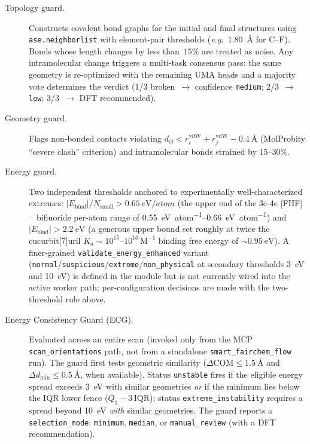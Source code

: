 \begin{description}
\item[Topology guard.] Constructs covalent bond graphs for the initial
  and final structures using \texttt{ase.neighborlist} with element-pair
  thresholds (\textit{e.g.}\ \SI{1.80}{\angstrom} for C--F). Bonds whose
  length changes by less than~$15\%$ are treated as noise. Any
  intramolecular change triggers a multi-task consensus pass: the same
  geometry is re-optimized with the remaining UMA heads and a majority
  vote determines the verdict (1/3 broken~$\to$ confidence
  \texttt{medium}; 2/3~$\to$ \texttt{low}; 3/3~$\to$ DFT recommended).
\item[Geometry guard.] Flags non-bonded contacts violating
  $d_{ij} < r_{i}^{\text{vdW}} + r_{j}^{\text{vdW}} -
  \SI{0.4}{\angstrom}$ (MolProbity ``severe clash'' criterion) and
  intramolecular bonds strained by 15--$30\%$.
\item[Energy guard.] Two independent thresholds anchored to
  experimentally well-characterized extremes:
  $|E_{\text{bind}}|/N_{\text{small}} > \SI{0.65}{\eV\per atom}$
  (the upper end of the 3c-4e [FHF]$^{-}$ bifluoride per-atom range
  of \SIrange{0.55}{0.66}{\eV\per atom}) and
  $|E_{\text{bind}}| > \SI{2.2}{\eV}$ (a generous upper bound set
  roughly at twice the cucurbit[7]uril
  $K_{a} \sim 10^{15}\textrm{--}10^{16}\,\text{M}^{-1}$ binding free
  energy of $\sim\!\SI{0.95}{\eV}$). A finer-grained
  \texttt{validate\_energy\_enhanced} variant
  (\texttt{normal}/\texttt{suspicious}/\texttt{extreme}/\texttt{non\_physical}
  at secondary thresholds \SI{3}{\eV} and \SI{10}{\eV}) is defined
  in the module but is not currently wired into the active worker
  path; per-configuration decisions are made with the two-threshold
  rule above.
\item[Energy Consistency Guard (ECG).] Evaluated across an entire
  scan (invoked only from the MCP \texttt{scan\_orientations} path,
  not from a standalone \texttt{smart\_fairchem\_flow} run). The guard
  first tests geometric similarity
  ($\Delta\mathrm{COM} \le \SI{1.5}{\angstrom}$ and
  $\Delta d_{\min} \le \SI{0.5}{\angstrom}$, when available). Status
  \texttt{unstable} fires if the eligible energy spread exceeds
  \SI{3}{\eV} with similar geometries \emph{or} if the minimum lies
  below the IQR lower fence ($Q_1 - 3\,\mathrm{IQR}$); status
  \texttt{extreme\_instability} requires a spread beyond \SI{10}{\eV}
  \emph{with} similar geometries. The guard reports a
  \texttt{selection\_mode}: \texttt{minimum}, \texttt{median}, or
  \texttt{manual\_review} (with a DFT recommendation).
\end{description}

